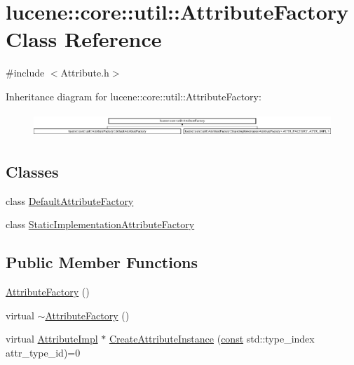 \hypertarget{classlucene_1_1core_1_1util_1_1AttributeFactory}{}\section{lucene\+:\+:core\+:\+:util\+:\+:Attribute\+Factory Class Reference}
\label{classlucene_1_1core_1_1util_1_1AttributeFactory}


{\ttfamily \#include $<$Attribute.\+h$>$}

Inheritance diagram for lucene\+:\+:core\+:\+:util\+:\+:Attribute\+Factory\+:\begin{figure}[H]
\begin{center}
\leavevmode
\includegraphics[height=0.907618cm]{classlucene_1_1core_1_1util_1_1AttributeFactory}
\end{center}
\end{figure}
\subsection*{Classes}
\begin{DoxyCompactItemize}
\item 
class \mbox{\hyperlink{classlucene_1_1core_1_1util_1_1AttributeFactory_1_1DefaultAttributeFactory}{Default\+Attribute\+Factory}}
\item 
class \mbox{\hyperlink{classlucene_1_1core_1_1util_1_1AttributeFactory_1_1StaticImplementationAttributeFactory}{Static\+Implementation\+Attribute\+Factory}}
\end{DoxyCompactItemize}
\subsection*{Public Member Functions}
\begin{DoxyCompactItemize}
\item 
\mbox{\hyperlink{classlucene_1_1core_1_1util_1_1AttributeFactory_a55d388271f308e3105344163e56dddc4}{Attribute\+Factory}} ()
\item 
virtual \mbox{\hyperlink{classlucene_1_1core_1_1util_1_1AttributeFactory_a0388433c20c2b44a344c2f5838060728}{$\sim$\+Attribute\+Factory}} ()
\item 
virtual \mbox{\hyperlink{classlucene_1_1core_1_1util_1_1AttributeImpl}{Attribute\+Impl}} $\ast$ \mbox{\hyperlink{classlucene_1_1core_1_1util_1_1AttributeFactory_a88ccb9965ed78099379eaf9b1256abf3}{Create\+Attribute\+Instance}} (\mbox{\hyperlink{ZlibCrc32_8h_a2c212835823e3c54a8ab6d95c652660e}{const}} std\+::type\+\_\+index attr\+\_\+type\+\_\+id)=0
\end{DoxyCompactItemize}
